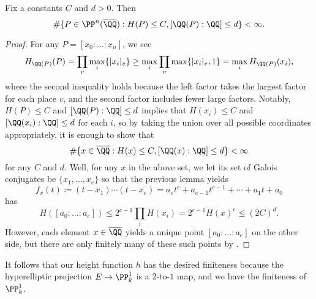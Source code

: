 \documentclass[../notes.tex]{subfiles}
\begin{document}
\begin{theorem}
	Fix a constants $C$ and $d>0$. Then
	\[\#\{P\in\PP^n(\overline\QQ):H(P)\le C,[\QQ(P):\QQ]\le d\}<\infty.\]
\end{theorem}
\begin{proof}
	For any $P=[x_0:\ldots:x_n]$, we see
	\[H_{\QQ(P)}(P)=\prod_v\max_i\{|x_i|_v\}\ge\max_i\prod_v\max\{|x_i|_v,1\}=\max_iH_{\QQ(P)}(x_i),\]
	where the second inequality holds because the left factor takes the largest factor for each place $v$, and the second factor includes fewer large factors. Notably, $H(P)\le C$ and $[\QQ(P):\QQ]\le d$ implies that $H(x_i)\le C$ and $[\QQ(x_i):\QQ]\le d$ for each $i$, so by taking the union over all possible coordinates appropriately, it is enough to show that
	\[\#\{x\in\overline\QQ:H(x)\le C,[\QQ(x):\QQ]\le d\}<\infty\]
	for any $C$ and $d$. Well, for any $x$ in the above set, we let its set of Galois conjugates be $\{x_1,\ldots,x_e\}$ so that the previous lemma yields
	\[f_x(t)\coloneqq(t-x_1)\cdots(t-x_e)=a_et^e+a_{e-1}t^{e-1}+\cdots+a_1t+a_0\]
	has
	\[H([a_0:\ldots:a_e])\le 2^{e-1}\prod_iH(x_i)=2^{e-1}H(x)^e\le(2C)^d.\]
	However, each element $x\in\overline\QQ$ yields a unique point $[a_0:\ldots:a_e]$ on the other side, but there are only finitely many of these such points by .
\end{proof}
It follows that our height function $h$ has the desired finiteness because the hyperelliptic projection $E\to\PP^1_k$ is a $2$-to-$1$ map, and we have the finiteness of $\PP^1_k$.
\end{document}
